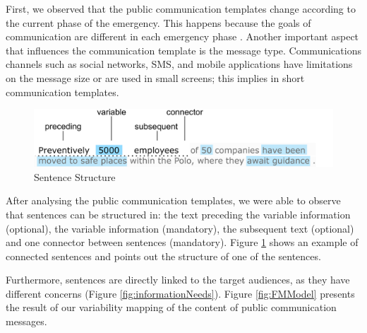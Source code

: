  First, we observed that the public communication templates change according to the current phase of the emergency. This happens because the goals of communication are different in each emergency phase \citep{cdc2014}. Another important aspect that influences the communication template is the message type. Communications channels such as social networks, SMS, and mobile applications have limitations on the message size or are used in small screens; this implies in short communication templates.
 
  \begin{figure}[]
\centering
\includegraphics[width=\linewidth]{images/sentenceStructure}
\caption{Sentence Structure}
\label{fig:sentenceStructure}
\end{figure}

 
 After analysing the public communication templates, we were able to observe that sentences can be structured in: the text preceding the variable information (optional), the variable information (mandatory), the subsequent text (optional) and one connector between sentences (mandatory). Figure \ref{fig:sentenceStructure}  shows an example of connected sentences and points out the structure of one of the sentences.
 
 Furthermore, sentences are directly linked to the target audiences, as they have different concerns (Figure \ref{fig:informationNeeds}). Figure \ref{fig:FMModel} presents the result of our variability mapping of the content of public communication messages.
 
